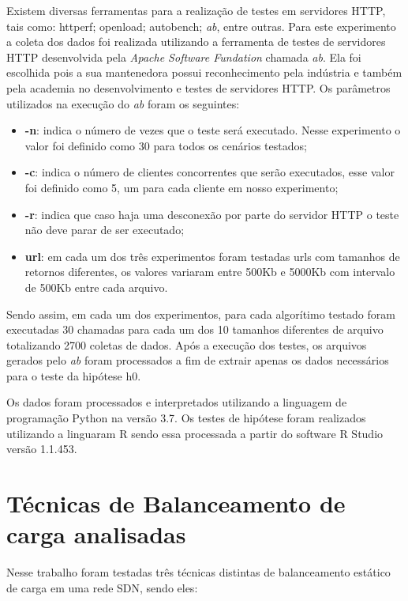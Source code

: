 \documentclass[12pt]{article}
\begin{document}
Existem diversas ferramentas para a realização de testes em servidores HTTP, tais como: httperf; openload; autobench; \textit{ab}, entre outras. Para este experimento a coleta dos dados foi realizada utilizando a ferramenta de testes de servidores HTTP desenvolvida pela \textit{Apache Software Fundation} chamada \textit{ab}. Ela foi escolhida pois a sua mantenedora possui reconhecimento pela indústria e também pela academia no desenvolvimento e testes de servidores HTTP. Os parâmetros utilizados na execução do \textit{ab} foram os seguintes:

\begin{itemize}
    \item \textbf{-n}: indica o número de vezes que o teste será executado. Nesse experimento o valor foi definido como 30 para todos os cenários testados;
    \item \textbf{-c}: indica o número de clientes concorrentes que serão executados, esse valor foi definido como 5, um para cada cliente em nosso experimento;
    \item \textbf{-r}: indica que caso haja uma desconexão por parte do servidor HTTP o teste não deve parar de ser executado;
    \item \textbf{url}: em cada um dos três experimentos foram testadas urls com tamanhos de retornos diferentes, os valores variaram entre 500Kb e 5000Kb com intervalo de 500Kb entre cada arquivo.
\end{itemize}

Sendo assim, em cada um dos experimentos, para cada algorítimo testado foram executadas 30 chamadas para cada um dos 10 tamanhos diferentes de arquivo totalizando 2700 coletas de dados. Após a execução dos testes, os arquivos gerados pelo \textit{ab} foram processados a fim de extrair apenas os dados necessários para o teste da hipótese h0.

Os dados foram processados e interpretados utilizando a linguagem de programação Python na versão 3.7. Os testes de hipótese foram realizados utilizando a linguaram R sendo essa processada a partir do software R Studio versão 1.1.453. 

\section{Técnicas de Balanceamento de carga analisadas}

Nesse trabalho foram testadas três técnicas distintas de balanceamento estático de carga em uma rede SDN, sendo eles:
\end{document}
